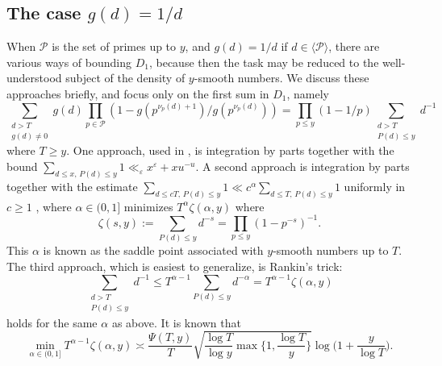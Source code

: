 \documentclass{article}
\theoremstyle{plain}
\theoremstyle{remark}
\newcommand{\Pa}{\mathcal{P}}
\numberwithin{equation}{section}
\begin{document}
\subsection{The case \texorpdfstring{$g(d)=1/d$}{gd=1/d}}
When $\Pa$ is the set of primes up to $y$, and $g(d)=1/d$ if $d \in \langle \Pa \rangle$, there are various ways of bounding $D_1$, because then the task may be reduced to the well-understood subject of the density of $y$-smooth numbers. We discuss these approaches briefly, and focus only on the first sum in $D_1$, namely
\[ \sum_{\substack{ d>T\\ g(d)\neq 0}} g(d)\prod_{p\in \Pa}(1-g(p^{\nu_p(d)+1})/g(p^{\nu_p(d)})) =\prod_{p \le y}(1-1/p)\sum_{\substack{d>T\\ P(d)\le y}} d^{-1}\]
where $T\ge y$. One approach, used in \cite[Lemma~3.5]{FordShifted}, is integration by parts together with the bound $\sum_{d\le x,\, P(d)\le y} 1 \ll_{\varepsilon} x^{\varepsilon}+ x u^{-u}$. A second approach is  integration by parts together with the estimate $\sum_{d\le cT,\, P(d)\le y} 1\ll c^{\alpha}\sum_{d\le T,\, P(d)\le y} 1$ uniformly in $c\ge 1$ \cite[Thm.~III.5.23]{Ten}, where $\alpha\in (0,1]$  minimizes $T^{\alpha} \zeta(\alpha,y)$ where
\[\zeta(s,y) := \sum_{P(d)\le y}d^{-s} = \prod_{p \le y}(1-p^{-s})^{-1}.\]
This $\alpha$ is known as the saddle point associated with $y$-smooth numbers up to $T$. The third approach, which is easiest to generalize, is Rankin's trick:
\[\sum_{\substack{d>T\\ P(d)\le y}} d^{-1} \le  T^{\alpha-1} \sum_{P(d)\le y} d^{-\alpha}=  T^{\alpha-1}\zeta(\alpha,y)\]
holds for the same $\alpha$ as above. It is known that \cite[Thm.~III.5.21]{Ten}
\[\min_{\alpha \in (0,1]} T^{\alpha-1} \zeta(\alpha,y) \asymp \frac{\Psi(T,y)}{T} \sqrt{\frac{\log T}{\log y}\max\{1,\frac{\log T}{y}\}}\log\big(1+\frac{y}{\log T}\big).\]
\end{document}
